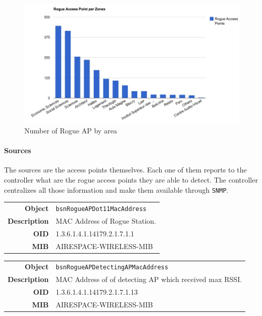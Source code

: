 \begin{figure}[H]
   \includegraphics[width=\textwidth]{Pictures/chapter5/rogue-ap.jpg}
   \caption{Number of Rogue AP by area}
\end{figure}

\paragraph*{Sources} The sources are the access points themselves. Each one of them reports to the controller what are the rogue access points they are able to detect. The controller centralizes all those information and make them available through \texttt{SNMP}.

\begin{tabular}{|r l|}
\hline
\textbf{Object} & \texttt{bsnRogueAPDot11MacAddress} \\
\textbf{Description} & \parbox{11cm}{MAC Address of Rogue Station.} \\
\textbf{OID} & 1.3.6.1.4.1.14179.2.1.7.1.1 \\
\textbf{MIB} & AIRESPACE-WIRELESS-MIB \\
\hline
\end{tabular}

\begin{tabular}{|r l|}
\hline
\textbf{Object} & \texttt{bsnRogueAPDetectingAPMacAddress} \\
\textbf{Description} & \parbox{11cm}{MAC Address of of detecting AP which received max RSSI.} \\
\textbf{OID} & 1.3.6.1.4.1.14179.2.1.7.1.13 \\
\textbf{MIB} & AIRESPACE-WIRELESS-MIB \\
\hline
\end{tabular}




